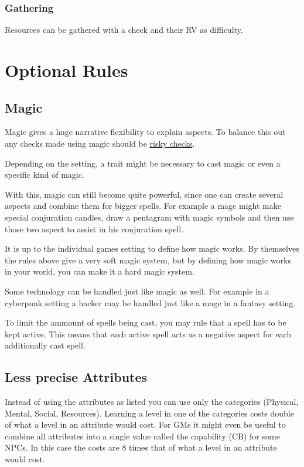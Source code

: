 \documentclass[11pt]{article}
\begin{document}
{\subsubsection{Gathering}
\label{sec:org7c1783a}
Resources can be gathered with a check and their RV as difficulty.
\section{Optional Rules}
\label{sec:org88c00ac}
\subsection{Magic}
\label{sec:orge6fbffd}

Magic gives a huge narrative flexibility to explain aspects. To balance this out any checks made using magic should be \hyperref[sec:orgfc629d3]{risky checks}.

Depending on the setting, a trait might be necessary to cast magic or even a specific kind of magic.

With this, magic can still become quite powerful, since one can create several aspects and combine them for bigger spells. For example a mage might make special conjuration candles, draw a pentagram with magic symbols and then use those two aspect to assist in his conjuration spell.

It is up to the individual games setting to define how magic works. By themselves the rules above give a very soft magic system, but by defining how magic works in your world, you can make it a hard magic system.

Some technology can be handled just like magic as well. For example in a cyberpunk setting a hacker may be handled just like a mage in a fantasy setting.

To limit the ammount of spells being cast, you may rule that a spell has to be kept active. This means that each active spell acts as a negative aspect for each additionally cast spell. 
\subsection{Less precise Attributes}
\label{sec:org59dcf34}
Instead of using the attributes as listed you can use only the categories (Physical, Mental, Social, Resources). Learning a level in one of the categories costs double of what a level in an attribute would cost.
For GMs it might even be useful to combine all attributes into a single value called the capability (CB) for some NPCs. In this case the costs are 8 times that of what a level in an attribute would cost.
}
\end{document}
